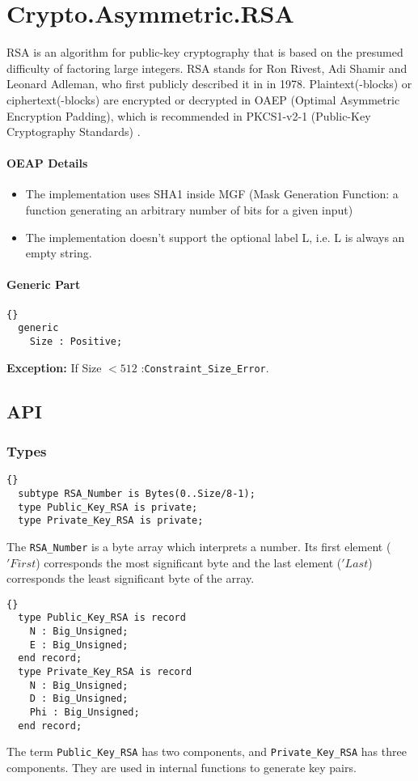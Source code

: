 \chapter{Crypto.Asymmetric.RSA}
RSA is an algorithm for public-key cryptography that is based on the presumed difficulty of factoring large integers. RSA stands for Ron Rivest, Adi Shamir and Leonard Adleman, who first publicly described it in \cite{PKCS} in 1978. Plaintext(-blocks) or ciphertext(-blocks) are encrypted or decrypted in OAEP (Optimal Asymmetric Encryption Padding), which is recommended in PKCS1-v2-1 (Public-Key Cryptography Standards) \cite{PKCS}.
\subsubsection*{OEAP Details}
\begin{itemize}
\item The implementation uses SHA1 inside MGF (Mask Generation Function: a function generating an arbitrary number of bits for a given input)
\item The implementation doesn't support the optional label L, i.e. L is always an empty string.
\end{itemize}
\subsubsection*{Generic Part}
\begin{lstlisting}{}
  generic
    Size : Positive;
\end{lstlisting}
\textbf{Exception:} If Size $< 512$ :\quad \texttt{Constraint\_Size\_Error}.\\
\section{API}
\subsection*{Types}
\begin{lstlisting}{}
  subtype RSA_Number is Bytes(0..Size/8-1);
  type Public_Key_RSA is private;
  type Private_Key_RSA is private;
\end{lstlisting}
The \texttt{RSA\_Number} is a byte array which interprets a number. Its first element ($'First$) corresponds the most significant byte and the last element ($'Last$) corresponds the least significant byte of the array.\\
\begin{lstlisting}{}
  type Public_Key_RSA is record
    N : Big_Unsigned;
    E : Big_Unsigned;
  end record;
  type Private_Key_RSA is record
    N : Big_Unsigned;
    D : Big_Unsigned;
    Phi : Big_Unsigned;
  end record;
\end{lstlisting}
The term \texttt{Public\_Key\_RSA} has two components, and \texttt{Private\_Key\_RSA} has three components. They are used in internal functions to generate key pairs.\\
